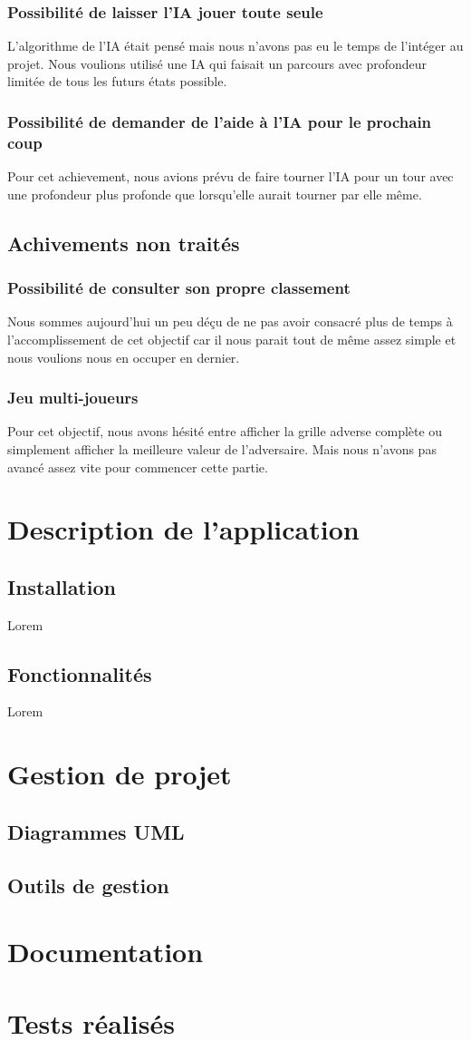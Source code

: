 \documentclass[a4paper,10pt]{report}
\begin{document}
    \section{Possibilité de laisser l'IA jouer toute seule}
      L'algorithme de l'IA était pensé mais nous n'avons pas eu le temps de l'intéger au projet. Nous voulions utilisé une IA qui faisait un parcours avec profondeur
      limitée de tous les futurs états possible.
    \section{Possibilité de demander de l'aide à l'IA pour le prochain coup}
      Pour cet achievement, nous avions prévu de faire tourner l'IA pour un tour avec une profondeur plus profonde que lorsqu'elle aurait tourner par elle même.
  \chapter{Achivements non traités}
    \section{Possibilité de consulter son propre classement}
      Nous sommes aujourd'hui un peu déçu de ne pas avoir consacré plus de temps à l'accomplissement de cet objectif car il nous parait tout de même assez simple et nous voulions nous en occuper en dernier.
    \section{Jeu multi-joueurs}
      Pour cet objectif, nous avons hésité entre afficher la grille adverse complète ou simplement afficher la meilleure valeur de l'adversaire. Mais nous n'avons pas avancé assez vite pour 
      commencer cette partie.
\part{Description de l'application}
  \chapter{Installation}
    Lorem
  \chapter{Fonctionnalités}
    Lorem
\part{Gestion de projet}
  \chapter{Diagrammes UML}
  \chapter{Outils de gestion}
\part{Documentation}
\part{Tests réalisés}
\end{document}
